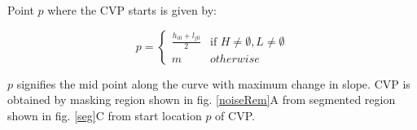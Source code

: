 Point $p$ where the CVP starts is given by:

				\begin{equation}\label{eq:cvp}
				p = \begin{cases} \frac{h_{i0} + l_{j0}}{2} & \mbox{if } H \neq \emptyset, L \neq \emptyset\\ 
				m &  otherwise \end{cases} 
				\end{equation}  
				\normalsize
				
$p$ signifies the mid point along the curve with maximum change in slope. CVP is obtained by masking region shown in fig. \ref{noiseRem}A from segmented region shown in fig. \ref{seg}C from start location $p$ of CVP.